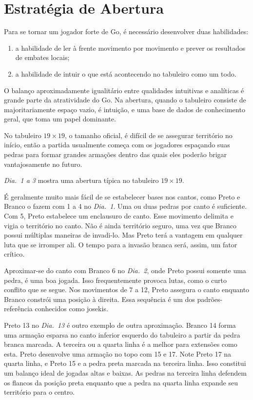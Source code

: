 \chapter{Estratégia de Abertura}\label{chap:6:estrat_abertura}

Para se tornar um jogador forte de Go, é necessário desenvolver duas habilidades:

\begin{enumerate}
    \item a habilidade de ler à frente movimento por movimento e prever os resultados de embates locais;
    \item a habilidade de intuir o que está acontecendo no tabuleiro como um todo.
\end{enumerate}

O balanço aproximadamente igualitário entre qualidades intuitivas e analíticas é grande parte da atratividade do Go. Na abertura, quando o tabuleiro consiste de majoritariamente espaço vazio, é intuição, e uma base de dados de conhecimento geral, que toma um papel dominante.

No tabuleiro $19\times19$, o tamanho oficial, é difícil de se assegurar território no início, então a partida usualmente começa com os jogadores espaçando suas pedras para formar grandes armações dentro das quais eles poderão brigar vantajosamente no futuro.

\emph{Dia.\@~1 a 3} mostra uma abertura típica no tabuleiro $19\times19$.

É geralmente muito mais fácil de se estabelecer bases nos cantos, como Preto e Branco o fazem com 1 a 4 no \emph{Dia.\@~1}. Uma ou duas pedras por canto é suficiente. Com 5, Preto estabelece um enclausuro de canto. Esse movimento delimita e vigia o território no canto. Não é ainda território seguro, uma vez que Branco possui múltiplas maneiras de invadi-lo. Mas Preto terá a vantagem em qualquer luta que se irromper ali. O tempo para a invasão branca será, assim, um fator crítico.

Aproximar-se do canto com Branco 6 no \emph{Dia.\@~2}, onde Preto possui somente uma pedra, é uma boa jogada. Isso frequentemente provoca lutas, como o curto conflito que se segue. Nos movimentos de 7 a 12, Preto assegura  o canto enquanto Branco constrói uma posição à direita. Essa sequência é um dos padrões-referência conhecidos como josekis.

Preto 13 no \emph{Dia.\@~13} é outro exemplo de outra aproximação. Branco 14 forma uma armação esparsa no canto inferior esquerdo do tabuleiro a partir da pedra branca marcada. A terceira ou a quarta linha é a melhor para extensões como esta. Preto desenvolve uma armação no topo com 15 e 17. Note Preto 17 na quarta linha, e Preto 15 e a pedra preta marcada na terceira linha. Isso constitui um balanço ideal de jogadas altas e baixas. As pedras na terceira linha defendem os flancos da posição preta enquanto que a pedra na quarta linha expande seu território para o centro.

